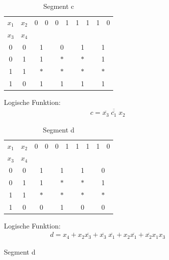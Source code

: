 \documentclass[numbers=noenddot,12pt,a4paper]{scrartcl}
\newcommand{\nicht}[1]{\overline{#1}}
\begin{document}
\begin{figure}[H]
\begin{minipage}[htbp]{0.49\textwidth}
\begin{table}[H]
\centering
\begin{tabular}{cc||cc|cc|cc|cc}
$x_1$ & $x_2$ & 0 & 0 & 0 & 1 & 1 & 1 & 1 & 0 \\ \cline{0-1} 
$x_3$ & $x_4$ & & & & & & & & \\ \cline{1-10}
0 & 0 & \multicolumn{2}{|c|}{1} & \multicolumn{2}{|c|}{0} & \multicolumn{2}{|c|}{1} & \multicolumn{2}{|c}{1} \\
0 & 1 & \multicolumn{2}{|c|}{1} & \multicolumn{2}{|c|}{$\ast$} & \multicolumn{2}{|c|}{$\ast$} & \multicolumn{2}{|c}{1} \\ 
1 & 1 & \multicolumn{2}{|c|}{$\ast$} & \multicolumn{2}{|c|}{$\ast$} & \multicolumn{2}{|c|}{$\ast$} & \multicolumn{2}{|c}{$\ast$} \\ 
1 & 0 & \multicolumn{2}{|c|}{1} & \multicolumn{2}{|c|}{1} & \multicolumn{2}{|c|}{1} & \multicolumn{2}{|c}{1} \\ 
\end{tabular}
\caption{Segment c}
\end{table}
Logische Funktion:
\begin{align}
c=\overline{\overline{x_3} \; \overline{c_1} \; x_2}
\end{align}
\end{minipage}
\hfill
\begin{minipage}[htbp]{0.49\textwidth}
\begin{table}[H]
\centering
\begin{tabular}{cc||cc|cc|cc|cc}
$x_1$ & $x_2$ & 0 & 0 & 0 & 1 & 1 & 1 & 1 & 0 \\ \cline{0-1} 
$x_3$ & $x_4$ & & & & & & & & \\ \cline{1-10}
0 & 0 & \multicolumn{2}{|c|}{1} & \multicolumn{2}{|c|}{1} & \multicolumn{2}{|c|}{1} & \multicolumn{2}{|c}{0} \\
0 & 1 & \multicolumn{2}{|c|}{1} & \multicolumn{2}{|c|}{$\ast$} & \multicolumn{2}{|c|}{$\ast$} & \multicolumn{2}{|c}{1} \\ 
1 & 1 & \multicolumn{2}{|c|}{$\ast$} & \multicolumn{2}{|c|}{$\ast$} & \multicolumn{2}{|c|}{$\ast$} & \multicolumn{2}{|c}{$\ast$} \\ 
1 & 0 & \multicolumn{2}{|c|}{0} & \multicolumn{2}{|c|}{1} & \multicolumn{2}{|c|}{0} & \multicolumn{2}{|c}{0} \\ 
\end{tabular}
\caption{Segment d}
\end{table}
Logische Funktion:
\begin{align}
d=x_4+x_2\nicht{x_3}+\overline{x_3} \; \overline{x_1}+ x_2 \nicht{x_1}+ \nicht{x_2}x_1x_3
\end{align}
\end{minipage}
\end{figure}
\end{document}
